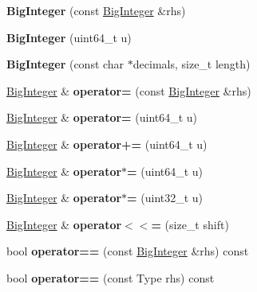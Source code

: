 \begin{DoxyCompactItemize}
\item 
\mbox{\label{a02248_abec623168bc9494dec2f50643b897f72}} 
{\bfseries Big\+Integer} (const \hyperlink{a02248}{Big\+Integer} \&rhs)
\item 
\mbox{\label{a02248_ad02b0ef9da203efddd4af07e923732c0}} 
{\bfseries Big\+Integer} (uint64\+\_\+t u)
\item 
\mbox{\label{a02248_a656bd1bd4af3920beb90ba4af87b6181}} 
{\bfseries Big\+Integer} (const char $\ast$decimals, size\+\_\+t length)
\item 
\mbox{\label{a02248_ae3eaf1b96cd993511c9f48a14dfc3af2}} 
\hyperlink{a02248}{Big\+Integer} \& {\bfseries operator=} (const \hyperlink{a02248}{Big\+Integer} \&rhs)
\item 
\mbox{\label{a02248_a4002e0b1cf5ee68ab94ab65b35167a38}} 
\hyperlink{a02248}{Big\+Integer} \& {\bfseries operator=} (uint64\+\_\+t u)
\item 
\mbox{\label{a02248_a09af1d6658d51ad4372649ce1c9c1a62}} 
\hyperlink{a02248}{Big\+Integer} \& {\bfseries operator+=} (uint64\+\_\+t u)
\item 
\mbox{\label{a02248_a79a52c6135c9783f2e53432dce2cde89}} 
\hyperlink{a02248}{Big\+Integer} \& {\bfseries operator$\ast$=} (uint64\+\_\+t u)
\item 
\mbox{\label{a02248_a83e8e464b7bc31c8b2c943f8563b2226}} 
\hyperlink{a02248}{Big\+Integer} \& {\bfseries operator$\ast$=} (uint32\+\_\+t u)
\item 
\mbox{\label{a02248_a48b12ef4676f19290dfd5816a4ef4a88}} 
\hyperlink{a02248}{Big\+Integer} \& {\bfseries operator$<$$<$=} (size\+\_\+t shift)
\item 
\mbox{\label{a02248_a52b424669238bdebc134e793d3b470ae}} 
bool {\bfseries operator==} (const \hyperlink{a02248}{Big\+Integer} \&rhs) const
\item 
\mbox{\label{a02248_a8b6ab0d652d461c1136e0388d352628b}} 
bool {\bfseries operator==} (const Type rhs) const

\end{DoxyCompactItemize}
